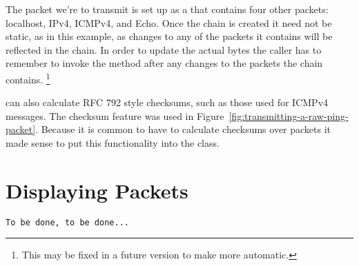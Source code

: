 \documentclass[11pt]{article}
\begin{document}
The packet we're to transmit is set up as a  that
contains four other packets: localhost, IPv4, ICMPv4, and Echo.  Once
the chain is created it need not be static, as in this example, as
changes to any of the packets it contains will be reflected in the
chain.  In order to update the actual bytes the caller has to remember
to invoke the  method after any changes to the packets
the chain contains.  \footnote{This may be fixed in a future version
  to make  more automatic.}

 can also calculate RFC 792 style checksums, such as
those used for ICMPv4 messages.  The checksum feature was used in
Figure~\ref{fig:transmitting-a-raw-ping-packet}.  Because it is common
to have to calculate checksums over packets it made sense to put this
functionality into the  class.

\section{Displaying Packets}
\label{sec:displaying-packets}

\begin{verbatim}
To be done, to be done...
\end{verbatim}
\end{document}
